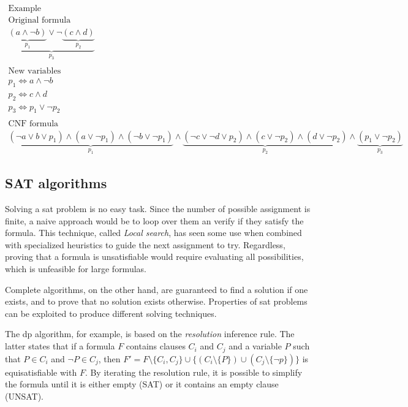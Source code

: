 \begin{multline*}
    \text{Example} \\
    \text{Original formula} \\
    \underbrace{\underbrace{(a \land \neg b)}_{p_1} \lor \neg \underbrace{(c \land d)}_{p_2}}_{p_3} \\
    \\
    \text{New variables} \\
    p_1 \iff a \land \neg b \\
    p_2 \iff c \land d \\
    p_3 \iff p_1 \lor \neg p_2 \\
    \\
    \text{CNF formula} \\
    \underbrace{(\neg a \lor b \lor p_1) \land (a \lor \neg p_1) \land (\neg b \lor \neg p_1)}_{p_1} \land \underbrace{(\neg c \lor \neg d \lor p_2) \land (c \lor \neg p_2) \land (d \lor \neg p_2)}_{p_2} \land \underbrace{(p_1 \lor \neg p_2)}_{p_3}
\end{multline*}

\subsection*{SAT algorithms}

Solving a \gls{sat} problem is no easy task.
Since the number of possible assignment is finite, a naive approach would be to loop over them an verify if they satisfy the formula.
This technique, called \textit{Local search}, has seen some use when combined with specialized heuristics to guide the next assignment to try.
Regardless, proving that a formula is unsatisfiable would require evaluating all possibilities, which is unfeasible for large formulas.

Complete algorithms, on the other hand, are guaranteed to find a solution if one exists, and to prove that no solution exists otherwise.
Properties of \gls{sat} problems can be exploited to produce different solving techniques.

The \gls{dp} algorithm, for example, is based on the \textit{resolution} inference rule.
The latter states that if a formula $F$ contains clauses $C_i$ and $C_j$ and a variable $P$ such that $P \in C_i$ and $\neg P \in C_j$, then $F' = F \setminus \{ C_i, C_j \} \cup \{(C_i \setminus \{ P \}) \cup (C_j \setminus \{\neg p\})\}$ is equisatisfiable with $F$.
By iterating the resolution rule, it is possible to simplify the formula until it is either empty (SAT) or it contains an empty clause (UNSAT).

